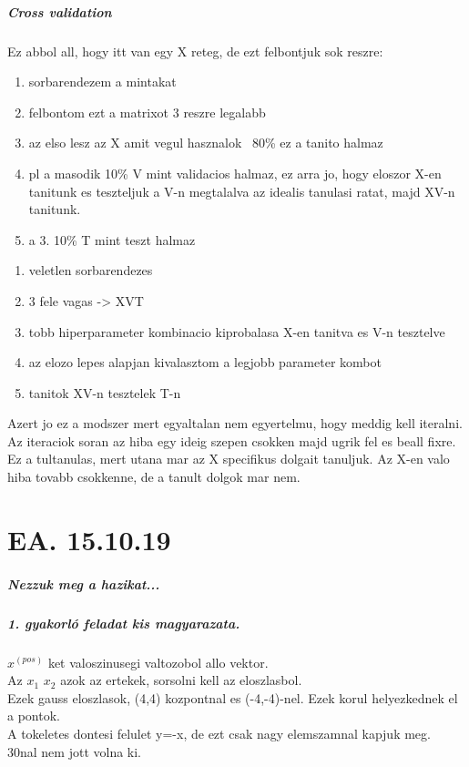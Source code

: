 \documentclass[10pt,a4paper]{report}
\begin{document}
\paragraph{Cross validation}
Ez abbol all, hogy itt van egy X reteg, de ezt felbontjuk sok reszre:
\begin{enumerate}
\item sorbarendezem a mintakat
\item felbontom ezt a matrixot 3 reszre legalabb
\item az elso lesz az X amit vegul hasznalok ~80\% ez a tanito halmaz
\item pl a masodik 10\% V mint validacios halmaz, ez arra jo, hogy eloszor X-en tanitunk es teszteljuk a V-n megtalalva az idealis tanulasi ratat, majd XV-n tanitunk.
\item a 3. 10\% T mint teszt halmaz
\end{enumerate}

\begin{enumerate}
\item veletlen sorbarendezes
\item 3 fele vagas -> XVT
\item tobb hiperparameter kombinacio kiprobalasa X-en tanitva es V-n tesztelve
\item az elozo lepes alapjan kivalasztom a legjobb parameter kombot
\item tanitok XV-n tesztelek T-n
\end{enumerate}
Azert jo ez a modszer mert egyaltalan nem egyertelmu, hogy meddig kell iteralni. Az iteraciok soran az hiba egy ideig szepen csokken majd ugrik fel es beall fixre. Ez a tultanulas, mert utana mar az X specifikus dolgait tanuljuk. Az X-en valo hiba tovabb csokkenne, de a tanult dolgok mar nem.

\chapter{EA. 15.10.19}
\paragraph{Nezzuk meg a hazikat...}
\paragraph{1. gyakorló feladat kis magyarazata.}
$x^(pos)$ ket valoszinusegi valtozobol allo vektor.\\
Az $x_1$ $x_2$ azok az ertekek, sorsolni kell az eloszlasbol.\\
Ezek gauss eloszlasok, (4,4) kozpontnal es (-4,-4)-nel. Ezek korul helyezkednek el a pontok. \\
A tokeletes dontesi felulet y=-x, de ezt csak nagy elemszamnal kapjuk meg.\\
30nal nem jott volna ki.\\
\end{document}
